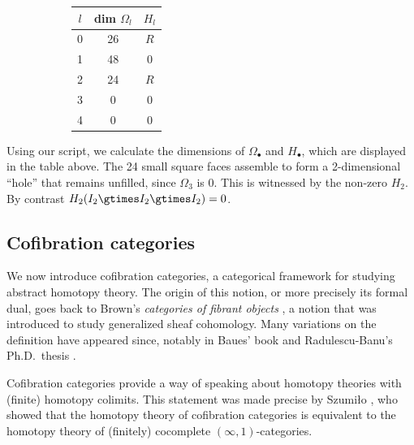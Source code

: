 \begin{example}
\begin{figure}[H]
\begin{subfigure}[c]{0.55\textwidth}
        \end{subfigure}
        \begin{subfigure}[c]{0.35\textwidth}
        \centering
        \begin{tabular}{||c||  c | c||} 
         \hline
         $l$ &  dim $\Omega_l$ & $H_l$ \\ [.5ex] 
         \hline\hline
        0 &  26 & $R$ \\ 
         \hline
         1 & 48 & 0 \\
         \hline
          2 & 24 & $R$ \\
         \hline
          3 & 0 & 0 \\
           \hline
          4 & 0 & 0 \\
         \hline
        \end{tabular}
        \end{subfigure}
    \end{figure}  
    Using our script, we calculate the dimensions of $\Omega_\bullet$ and $H_\bullet$, which are displayed in the table above.
    The 24 small square faces assemble to form a 2-dimensional ``hole'' that remains unfilled, since $\Omega_3$ is 0.
    This is witnessed by the non-zero $H_2$.
    By contrast $H_2(I_2 \gtimes I_2 \gtimes I_2) = 0$.
\end{example}

\subsection{Cofibration categories}

We now introduce cofibration categories, a categorical framework for studying abstract homotopy theory.
The origin of this notion, or more precisely its formal dual, goes back to Brown's \emph{categories of fibrant objects} \cite{brown:abstract-homotopy-theory}, a notion that was introduced to study generalized sheaf cohomology.
Many variations on the definition have appeared since, notably in Baues' book \cite{baues:algebraic-homotopy} and Radulescu-Banu's Ph.D.~thesis \cite{radulescu-banu}.

Cofibration categories provide a way of speaking about homotopy theories with (finite) homotopy colimits.
This statement was made precise by Szumi{\l}o \cite{szumilo:two-models}, who showed that the homotopy theory of cofibration categories is equivalent to the homotopy theory of (finitely) cocomplete $(\infty, 1)$-categories.

